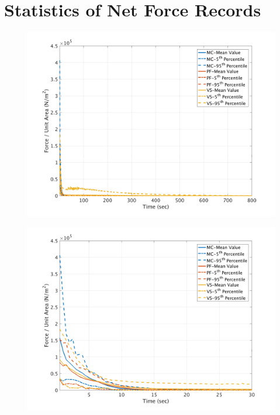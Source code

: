 \documentclass[a4paper,10pt]{article}
\begin{document}
\section{Statistics of Net Force Records}\label{sec:NetF}

\begin{figure}[H]
	\begin{minipage}[b]{0.5\linewidth}
	\centering
    \includegraphics[width=1\textwidth]{NetFAll/NetF1All.png}     
        \label{fig:NF1}
	\end{minipage}
	\begin{minipage}[b]{0.5\linewidth}
	\centering
    \includegraphics[width=1\textwidth]{NetFAll/NetF1All_z.png}
        \label{fig:NF1zoom}
	\end{minipage}
	

\end{figure}
\end{document}
